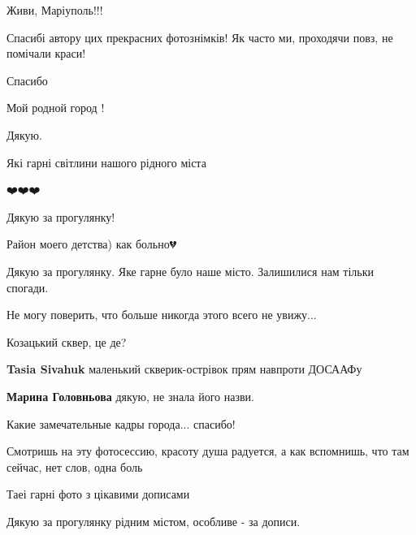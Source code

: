  
 
 
 
 

\qqSecCmt


Живи, Маріуполь!!!


Спасибі автору цих прекрасних фотознімків! Як часто ми, проходячи повз, не помічали краси!


Спасибо


Мой родной город !


Дякую.


Які гарні світлини нашого рідного міста


❤️❤️❤️


Дякую за прогулянку!


Район моего детства) как больно💔


Дякую за прогулянку. Яке гарне було наше місто. Залишилися нам тільки спогади.


Не могу поверить, что больше никогда этого всего не увижу...


Козацький сквер, це де?

\begin{itemize} %
\textbf{Tasia Sivahuk} маленький скверик-острівок прям навпроти ДОСААФу

\textbf{Марина Головньова} дякую, не знала його назви.
\end{itemize} %


Какие замечательные кадры города... спасибо!


Смотришь на эту фотосессию, красоту душа радуется, а как вспомнишь, что там
сейчас, нет слов, одна боль


Таеі гарні фото з цікавими дописами


Дякую за прогулянку рідним містом, особливе - за дописи.
